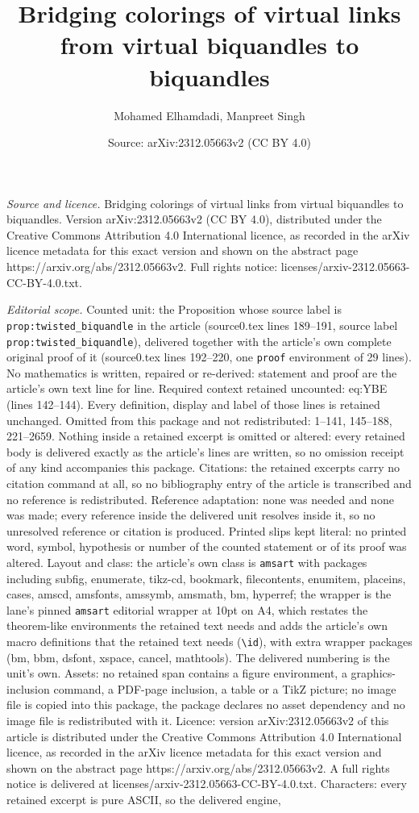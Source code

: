 \documentclass[10pt,a4paper]{amsart}
\title[Bridging colorings of virtual links from virtual biquandles ]{Bridging colorings of virtual links from virtual biquandles to biquandles}
\author{Mohamed Elhamdadi, Manpreet Singh}
\date{Source: arXiv:2312.05663v2 (CC BY 4.0)}
\begin{document}
\maketitle

\noindent\emph{Source and licence.} Bridging colorings of virtual links from virtual biquandles to biquandles. Version arXiv:2312.05663v2 (CC BY 4.0), distributed under the Creative Commons Attribution 4.0 International licence, as recorded in the arXiv licence metadata for this exact version and shown on the abstract page https://arxiv.org/abs/2312.05663v2. Full rights notice: licenses/arxiv-2312.05663-CC-BY-4.0.txt.\par\smallskip

\noindent\textit{Editorial scope.} Counted unit: the Proposition whose source label is \texttt{prop:twisted\_biquandle} in the article (source0.tex lines 189--191, source label \texttt{prop:twisted\_biquandle}), delivered together with the article's own complete original proof of it (source0.tex lines 192--220, one \texttt{proof} environment of 29 lines). No mathematics is written, repaired or re-derived: statement and proof are the article's own text line for line. Required context retained uncounted: eq:YBE (lines 142--144). Every definition, display and label of those lines is retained unchanged. Omitted from this package and not redistributed: 1--141, 145--188, 221--2659. Nothing inside a retained excerpt is omitted or altered: every retained body is delivered exactly as the article's lines are written, so no omission receipt of any kind accompanies this package. Citations: the retained excerpts carry no citation command at all, so no bibliography entry of the article is transcribed and no reference is redistributed. Reference adaptation: none was needed and none was made; every reference inside the delivered unit resolves inside it, so no unresolved reference or citation is produced. Printed slips kept literal: no printed word, symbol, hypothesis or number of the counted statement or of its proof was altered. Layout and class: the article's own class is \texttt{amsart} with packages including subfig, enumerate, tikz-cd, bookmark, filecontents, enumitem, placeins, cases, amscd, amsfonts, amssymb, amsmath, bm, hyperref; the wrapper is the lane's pinned \texttt{amsart} editorial wrapper at 10pt on A4, which restates the theorem-like environments the retained text needs and adds the article's own macro definitions that the retained text needs (\texttt{\textbackslash id}), with extra wrapper packages (bm, bbm, dsfont, xspace, cancel, mathtools). The delivered numbering is the unit's own. Assets: no retained span contains a figure environment, a graphics-inclusion command, a PDF-page inclusion, a table or a TikZ picture; no image file is copied into this package, the package declares no asset dependency and no image file is redistributed with it. Licence: version arXiv:2312.05663v2 of this article is distributed under the Creative Commons Attribution 4.0 International licence, as recorded in the arXiv licence metadata for this exact version and shown on the abstract page https://arxiv.org/abs/2312.05663v2. A full rights notice is delivered at licenses/arxiv-2312.05663-CC-BY-4.0.txt. Characters: every retained excerpt is pure ASCII, so the delivered engine, 
\end{document}
